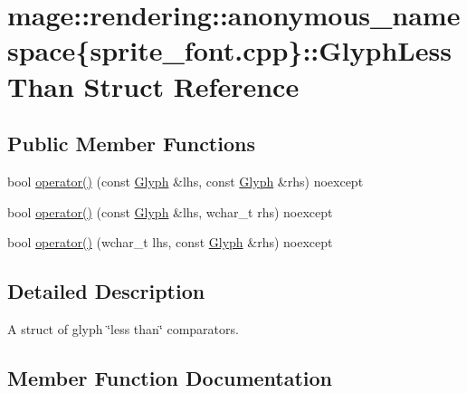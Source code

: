\hypertarget{structmage_1_1rendering_1_1anonymous__namespace_02sprite__font_8cpp_03_1_1_glyph_less_than}{}\section{mage\+:\+:rendering\+:\+:anonymous\+\_\+namespace\{sprite\+\_\+font.\+cpp\}\+:\+:Glyph\+Less\+Than Struct Reference}
\label{structmage_1_1rendering_1_1anonymous__namespace_02sprite__font_8cpp_03_1_1_glyph_less_than}
\subsection*{Public Member Functions}
\begin{DoxyCompactItemize}
\item 
bool \mbox{\hyperlink{structmage_1_1rendering_1_1anonymous__namespace_02sprite__font_8cpp_03_1_1_glyph_less_than_ab099eda05e0a9732e214ef2978d5e9dc}{operator()}} (const \mbox{\hyperlink{structmage_1_1rendering_1_1_glyph}{Glyph}} \&lhs, const \mbox{\hyperlink{structmage_1_1rendering_1_1_glyph}{Glyph}} \&rhs) noexcept
\item 
bool \mbox{\hyperlink{structmage_1_1rendering_1_1anonymous__namespace_02sprite__font_8cpp_03_1_1_glyph_less_than_a3c9113624b6a36eac4e9a627445ae7ac}{operator()}} (const \mbox{\hyperlink{structmage_1_1rendering_1_1_glyph}{Glyph}} \&lhs, wchar\+\_\+t rhs) noexcept
\item 
bool \mbox{\hyperlink{structmage_1_1rendering_1_1anonymous__namespace_02sprite__font_8cpp_03_1_1_glyph_less_than_ae015502572d006536836251420a78329}{operator()}} (wchar\+\_\+t lhs, const \mbox{\hyperlink{structmage_1_1rendering_1_1_glyph}{Glyph}} \&rhs) noexcept
\end{DoxyCompactItemize}


\subsection{Detailed Description}
A struct of glyph \char`\"{}less than\char`\"{} comparators. 

\subsection{Member Function Documentation}
\mbox{\label{structmage_1_1rendering_1_1anonymous__namespace_02sprite__font_8cpp_03_1_1_glyph_less_than_ab099eda05e0a9732e214ef2978d5e9dc}} 
